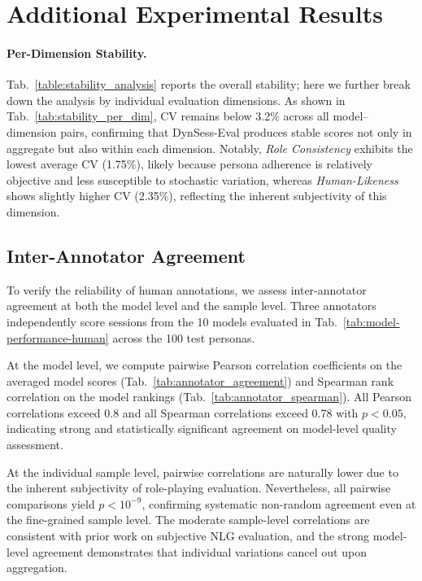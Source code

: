 \section{Additional Experimental Results}



\paragraph{Per-Dimension Stability.}
Tab.~\ref{table:stability_analysis} reports the overall stability; here we further break down the analysis by individual evaluation dimensions. As shown in Tab.~\ref{tab:stability_per_dim}, CV remains below 3.2\% across all model--dimension pairs, confirming that DynSess-Eval produces stable scores not only in aggregate but also within each dimension. Notably, \textit{Role Consistency} exhibits the lowest average CV (1.75\%), likely because persona adherence is relatively objective and less susceptible to stochastic variation, whereas \textit{Human-Likeness} shows slightly higher CV (2.35\%), reflecting the inherent subjectivity of this dimension.



\subsection{Inter-Annotator Agreement}
\label{app:iaa}
To verify the reliability of human annotations, we assess inter-annotator agreement at both the model level and the sample level. Three annotators independently score sessions from the 10 models evaluated in Tab.~\ref{tab:model-performance-human} across the 100 test personas.

At the model level, we compute pairwise Pearson correlation coefficients on the averaged model scores (Tab.~\ref{tab:annotator_agreement}) and Spearman rank correlation on the model rankings (Tab.~\ref{tab:annotator_spearman}). All Pearson correlations exceed 0.8 and all Spearman correlations exceed 0.78 with $p < 0.05$, indicating strong and statistically significant agreement on model-level quality assessment.

At the individual sample level, pairwise correlations are naturally lower due to the inherent subjectivity of role-playing evaluation. Nevertheless, all pairwise comparisons yield $p < 10^{-9}$, confirming systematic non-random agreement even at the fine-grained sample level. The moderate sample-level correlations are consistent with prior work on subjective NLG evaluation, and the strong model-level agreement demonstrates that individual variations cancel out upon aggregation.



